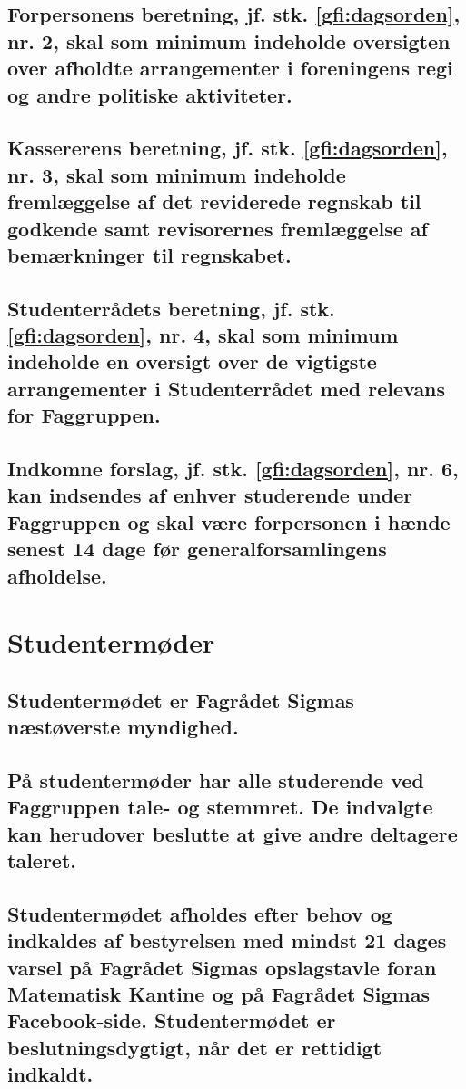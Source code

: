 \documentclass[10pt]{article}
\begin{document}
\subsection{Forpersonens beretning, jf. stk. \ref{gfi:dagsorden}, nr. 2, skal som minimum indeholde oversigten over afholdte arrangementer i foreningens regi og andre politiske aktiviteter.}

\subsection{Kassererens beretning, jf. stk. \ref{gfi:dagsorden}, nr. 3, skal som minimum indeholde fremlæggelse af det reviderede regnskab til godkende samt revisorernes fremlæggelse af bemærkninger til regnskabet.}

\subsection{Studenterrådets beretning, jf. stk. \ref{gfi:dagsorden}, nr. 4, skal som minimum indeholde en oversigt over de vigtigste arrangementer i Studenterrådet med relevans for Faggruppen.}

\subsection{Indkomne forslag, jf. stk. \ref{gfi:dagsorden}, nr. 6, kan indsendes af enhver studerende under Faggruppen og skal være forpersonen i hænde senest 14 dage før generalforsamlingens afholdelse.}

\section{Studentermøder}

\subsection{Studentermødet er Fagrådet Sigmas næstøverste myndighed.}

\subsection{På studentermøder har alle studerende ved Faggruppen tale- og stemmret. De indvalgte kan herudover beslutte at give andre deltagere taleret.}

\subsection{Studentermødet afholdes efter behov og indkaldes af bestyrelsen med mindst 21 dages varsel på Fagrådet Sigmas opslagstavle foran Matematisk Kantine og på Fagrådet Sigmas Facebook-side. Studentermødet er beslutningsdygtigt, når det er rettidigt indkaldt.}
\end{document}
